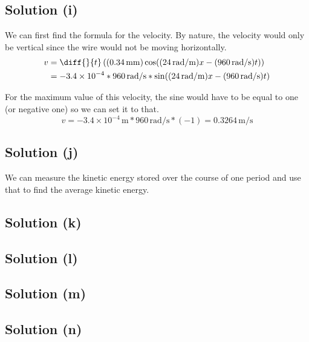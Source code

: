 \documentclass[12pt]{article}
\newcommand{\E}[1]{\times 10^{#1}}
\begin{document}
        \subsection{Solution (i)}
            We can first find the formula for the velocity.
            By nature, the velocity would only be vertical since the wire would not be moving horizontally.
            \begin{align}
                v   &=  \diff{}{t}\left( (0.34\,\unit{\milli\meter}) \cos((24\,\unit{\radian/\meter})x - (960\,\unit{\radian/\second})t) \right)\\
                    &=  - 3.4\E{-4} * 960\,\unit{\radian/\second} * \sin((24\,\unit{\radian/\meter})x - (960\,\unit{\radian/\second})t)
            \end{align}

            For the maximum value of this velocity, the sine would have to be equal to one (or negative one) so we can set it to that.
            \begin{equation}
                v   =   -3.4\E{-4}\,\unit{\meter} * 960\,\unit{\radian/\second} * (-1)
                    =   \boxed{0.3264\,\unit{\meter/\second}}
            \end{equation}

        \subsection{Solution (j)}
            We can measure the kinetic energy stored over the course of one period and use that to find the average kinetic energy.

        \subsection{Solution (k)}

        \subsection{Solution (l)}

        \subsection{Solution (m)}

        \subsection{Solution (n)}
\end{document}
